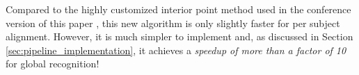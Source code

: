 
Compared to the highly customized interior point method used in the conference
version of this paper \cite{Wagner2009-CVPR}, this new algorithm is only
slightly faster for per subject alignment. However, it is much simpler to
implement and, as discussed in Section \ref{sec:pipeline_implementation}, it
achieves a \emph{speedup of more than a factor of 10} for global recognition!
